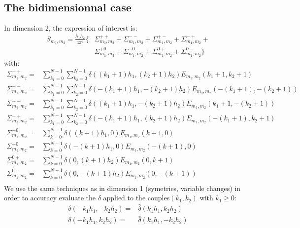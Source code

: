 \subsection{The bidimensionnal case}
In dimension 2, the expression of interest is:
\begin{align}
S_{m_1,m_2}=\frac{h_1h_2}{4\pi^2}\Big\{&\Sigma_{m_1,m_2}^{++} + \Sigma_{m_1,m_2}^{--} + \Sigma_{m_1,m_2}^{+-} + \Sigma_{m_1,m_2}^{-+}+\nonumber\\
  &\Sigma_{m_1,m_2}^{+0}+\Sigma_{m_1,m_2}^{-0}+\Sigma_{m_1,m_2}^{0+}+\Sigma_{m_1,m_2}^{0-}\Big\}
\end{align}
with:
\begin{align}
\Sigma_{m_1,m_2}^{++}=&\sum_{k_1=0}^{N-1}\sum_{k_2=0}^{N-1}\delta\left((k_1+1)h_1,(k_2+1)h_2\right)E_{m_1,m_2}(k_1+1,k_2+1)\\
\Sigma_{m_1,m_2}^{--}=&\sum_{k_1=0}^{N-1}\sum_{k_2=0}^{N-1}\delta\left(-(k_1+1)h_1,-(k_2+1)h_2\right)E_{m_1,m_2}(-(k_1+1),-(k_2+1))\\
\Sigma_{m_1,m_2}^{+-}=&\sum_{k_1=0}^{N-1}\sum_{k_2=0}^{N-1}\delta\left((k_1+1)h_1,-(k_2+1)h_2\right)E_{m_1,m_2}(k_1+1,-(k_2+1))\\
\Sigma_{m_1,m_2}^{-+}=&\sum_{k_1=0}^{N-1}\sum_{k_2=0}^{N-1}\delta\left(-(k_1+1)h_1,(k_2+1)h_2\right)E_{m_1,m_2}(-(k_1+1),k_2+1)\\
\Sigma_{m_1,m_2}^{+0}=&\sum_{k=0}^{N-1}\delta((k+1)h_1,0)E_{m_1,m_2}(k+1,0)\\
\Sigma_{m_1,m_2}^{-0}=&\sum_{k=0}^{N-1}\delta(-(k+1)h_1,0)E_{m_1,m_2}(-(k+1),0)\\
\Sigma_{m_1,m_2}^{0+}=&\sum_{k=0}^{N-1}\delta(0,(k+1)h_2)E_{m_1,m_2}(0,k+1)\\
\Sigma_{m_1,m_2}^{0-}=&\sum_{k=0}^{N-1}\delta(0,-(k+1)h_2)E_{m_1,m_2}(0,-(k+1))\\
\end{align}
We use the same techniques as in dimension 1 (symetries, variable changes) in order to accuracy evaluate the $\delta$ applied to the couples$(k_1, k_2)$ with $k_1\geq 0$:
\begin{align}
\delta\left(-k_1h_1,-k_2h_2\right)=&\bar{\delta}\left(k_1h_1,k_2h_2\right)\\
\delta\left(-k_1h_1, k_2h_2\right)=&\bar{\delta}\left(k_1h_1,-k_2h_2\right)\\
\end{align}

